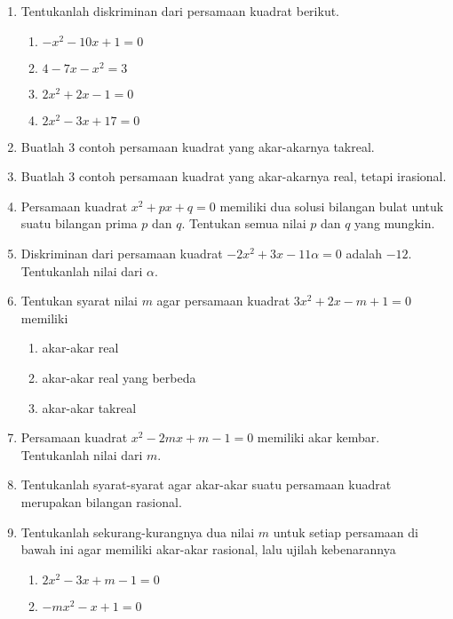 \begin{enumerate}[topsep=0pt]
			\item Tentukanlah diskriminan dari persamaan kuadrat berikut.
			\begin{multcols}
				\begin{enumerate}
					\item $ -x^{2} - 10x + 1 = 0 $
					\item $ 4 - 7x - x^{2} = 3 $
					\item $ 2x^{2} + 2x - 1 = 0 $
					\item $ 2x^{2} - 3x + 17 = 0 $
				\end{enumerate}
			\end{multcols}
			\item Buatlah 3 contoh persamaan kuadrat yang akar-akarnya takreal.
			\item Buatlah 3 contoh persamaan kuadrat yang akar-akarnya real, tetapi irasional.
			\item Persamaan kuadrat $ x^{2} + px + q = 0 $ memiliki dua solusi bilangan bulat untuk suatu bilangan prima $ p $ dan $ q $. Tentukan semua nilai $ p $ dan $ q $ yang mungkin.
			\item Diskriminan dari persamaan kuadrat $ -2x^{2} + 3x - 11\alpha = 0 $ adalah $ -12 $. Tentukanlah nilai dari $ \alpha $.
			\item Tentukan syarat nilai $ m $ agar persamaan kuadrat $ 3x^{2} + 2x - m + 1 = 0 $ memiliki
			\begin{multcols}
				\begin{enumerate}
					\item akar-akar real
					\item akar-akar real yang berbeda
					\item akar-akar takreal
				\end{enumerate}
			\end{multcols}
			\item Persamaan kuadrat $ x^{2} - 2mx + m - 1 = 0 $ memiliki akar kembar. Tentukanlah nilai dari $ m $.
			\item {} Tentukanlah syarat-syarat agar akar-akar suatu persamaan kuadrat merupakan bilangan rasional.
			\item Tentukanlah sekurang-kurangnya dua nilai $ m $ untuk setiap persamaan di bawah ini agar memiliki akar-akar rasional, lalu ujilah kebenarannya
			\begin{multcols}
				\begin{enumerate}
					\item $ 2x^{2} - 3x + m - 1 = 0 $
					\item $ -mx^{2} - x + 1 = 0 $

\end{enumerate}
\end{multcols}
\end{enumerate}
